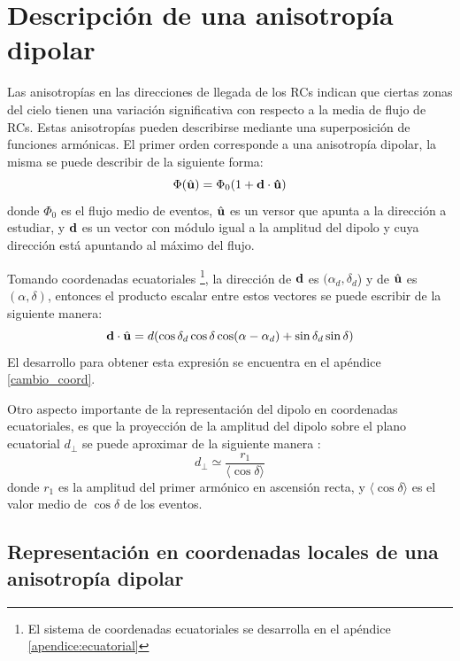 \section{Descripción de una anisotropía dipolar}
Las anisotropías en las direcciones de llegada de los RCs indican que ciertas zonas del cielo tienen una variación significativa con respecto a la media de flujo de RCs. Estas anisotropías pueden describirse mediante una superposición de funciones armónicas. El primer orden corresponde a una anisotropía dipolar, la misma se puede describir de la siguiente forma:
\begin{equation}
    \Phi(\hat{\bf{u}}) = \Phi_0(1+\bf{d}\cdot\hat{\bf{u}})
    \label{eq:dipolo_general}
\end{equation}
\noindent donde $\Phi_0$ es el flujo medio de eventos, $\hat{\bf{u}}$ es un versor que apunta a la dirección a estudiar, y $\bf{d}$ es un vector con módulo igual a la amplitud del dipolo y cuya dirección está apuntando al máximo del flujo. 

Tomando coordenadas ecuatoriales \footnote{El sistema de coordenadas ecuatoriales se desarrolla en el apéndice \ref{apendice:ecuatorial}}, la dirección de $\bf{d}$ es $(\alpha_d, \delta_d$) y de $\hat{\bf{u}}$ es $(\alpha, \delta)$, entonces  el producto escalar  entre estos vectores se puede escribir de la siguiente manera:
\begin{equation}
    \textbf{d}\cdot\hat{\bf{u}}= d (\cos\delta_d \cos\delta \cos(\alpha - \alpha_d) + \sin\delta_d  \sin\delta)
    \label{eq:product_ud}
\end{equation}
El desarrollo para obtener esta expresión se encuentra en el apéndice \ref{cambio_coord}.

Otro aspecto importante de la representación del dipolo en coordenadas ecuatoriales, es que la proyección de la amplitud del dipolo sobre el plano ecuatorial $d_\perp$ se puede aproximar de la siguiente manera \cite{taborda} :
\begin{equation}
    d_\perp \simeq \frac{r_1}{ \langle \cos\delta \rangle}
    \label{eq:fourier_perp}
\end{equation}
donde $r_1$ es la amplitud del primer armónico en ascensión recta, y $\langle \cos\delta \rangle$ es el valor medio de $\cos\delta $ de los eventos.

\subsection{Representación en coordenadas locales de una anisotropía dipolar}

